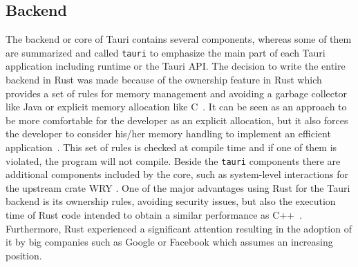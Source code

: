 \subsection{Backend}
\label{subsec:tauri:backend}
The backend or core of Tauri contains several components, whereas some of them are summarized and called \texttt{tauri} to emphasize the main part of each Tauri application including runtime or the Tauri \ac{API}.
The decision to write the entire backend in Rust was made because of the ownership feature in Rust which provides a set of rules for memory management and avoiding a garbage collector like Java or explicit memory allocation like C~\cite{tauri}.
It can be seen as an approach to be more comfortable for the developer as an explicit allocation, but it also forces the developer to consider his/her memory handling to implement an efficient application~\cite{klabnik2019rust}.
This set of rules is checked at compile time and if one of them is violated, the program will not compile.
Beside the \texttt{tauri} components there are additional components included by the core, such as system-level interactions for the upstream crate \ac{WRY} .
One of the major advantages using Rust for the Tauri backend is its ownership rules, avoiding security issues, but also the execution time of Rust code intended to obtain a similar performance as C++~\cite{klabnik2019rust}.
Furthermore, Rust experienced a significant attention resulting in the adoption of it by big companies such as Google or Facebook which assumes an increasing position.

